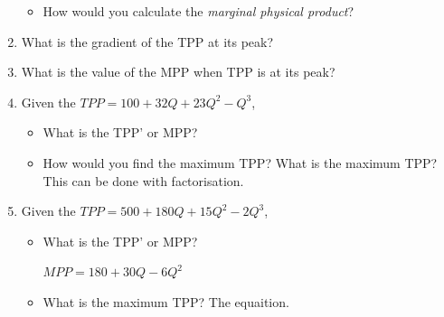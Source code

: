 \documentclass[12pt, a4paper, oneside]{article}\usepackage[]{graphicx}\usepackage[]{color}
\newenvironment{knitrout}{}{} %
\begin{document}
\begin{enumerate}
\begin{itemize}
\begin{knitrout}
{}



\end{knitrout}
\item How would you calculate the \emph{marginal physical product}?

\end{itemize}

\item What is the gradient of the TPP at its peak? 

\item What is the value of the MPP when TPP is at its peak? 

\item Given the $TPP = 100 + 32Q +23Q^2 - Q^3$, 
\begin{itemize}
\item What is the TPP' or MPP?

\item How would you find the maximum TPP? What is the maximum TPP? This can be done with factorisation. 

\end{itemize}

\item Given the $TPP = 500 + 180Q + 15Q^2 - 2Q^3$, 
\begin{itemize}
\item What is the TPP' or MPP?

$MPP = 180 + 30Q -6Q^2$

\item What is the maximum TPP? The equaition.

\end{itemize}


\end{enumerate}
\end{document}

